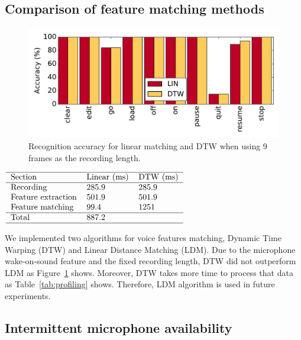 \subsection{Comparison of feature matching methods}
%
\begin{figure}
\centering
\includegraphics[width=\linewidth]{figures/DTWvsLDM}
\caption{Recognition accuracy for linear matching and DTW when using 9 frames as the recording length.}
\label{fig:DTWvsLDM}
\end{figure}
%
\begin{table}
	\centering
	\caption{Profiling of features matching algorithms: Dynamic Time Warping (DTW) and Linear Distance Matching (LDM)}
	\label{tab:profiling}
	$
	\begin{tabular}{lll}\hline
	Section & Linear (ms) & DTW (ms) \\\hline
	Recording & 285.9  & 285.9 \\
	Feature extraction & 501.9 & 501.9 \\
	Feature matching &  99.4 & 1251 \\\hline
	Total & 887.2 & \\\hline
	\end{tabular}
	$
\end{table}
%
We implemented two algorithms for voice features matching, Dynamic Time Warping (DTW) and Linear Distance Matching (LDM). Due to the microphone wake-on-sound feature and the fixed recording length, DTW did not outperform LDM as Figure~\ref{fig:DTWvsLDM} shows. Moreover, DTW takes more time to process that data as Table~\ref{tab:profiling} shows. Therefore, LDM algorithm is used in future experiments.

\subsection{ Intermittent microphone availability}
%

